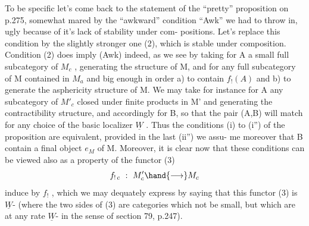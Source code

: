 To be specific let's come back to the statement of the ``pretty''
proposition on p.275,  somewhat mared by the ``awkward'' condition ``Awk''
we had to throw in,  ugly because of it's lack of stability under com-%
positions.  Let's replace this condition by the slightly stronger one
(2),  which is stable under composition.  Condition (2) does imply
(Awk) indeed,  as we see by taking for A a small full subcategory of
$M_c$ ,  generating the  structure of M,  and for  any
full subcategory of M contained in $M_a$ and big enough in order  a) to
contain $f_!(A)$  and  b)  to generate the asphericity structure of M.
We may take for instance for A any subcategory of $M'_c$  closed under
finite products in M' and generating the contractibility structure,
and accordingly for B,  so that the pair (A,B) will match for any
choice of the basic localizer $\underline{W}$ .  Thus the  conditions  (i) to (i'')
of the proposition are equivalent,  provided in the last (ii'') we assu-%
me moreover that B contain a final object $e_M$ of M.  Moreover,  it is
clear now that these conditions can be viewed also as a property of the
functor
(3) \[ f_{!\,c} \ : \ M'_c \hand{\longrightarrow} M_c \]
induce by $f_!$ ,  which we may dequately express by saying that this
functor (3)  is $\underline{W}$-\hand{\uline{\textcolor{black}{aspheric}}} (where the two sides of (3) are categories
which  not be small,  but which are at any rate $\underline{W}$-\hand{\uline{\textcolor{black}{aspherators}}}  in
the sense of section 79, p.247).

